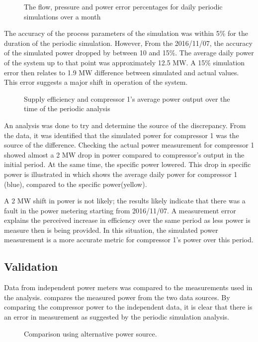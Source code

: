 	\begin{figure}[h!]
		\centering
		
		\caption{The flow, pressure and power error percentages for daily periodic simulations over a month}
		\label{fig: Periodic simulation}
	\end{figure} 
The accuracy of the process parameters of the simulation was within 5\% for the duration of the periodic simulation. However, From the 2016/11/07, the accuracy of the simulated power dropped by between 10 and 15\%. The average daily power of the system up to that point was approximately 12.5 MW. A 15\% simulation error then relates to 1.9 MW difference between simulated and actual values. This error suggests a major shift in operation of the system.
\par 
\begin{figure}[h!]
	\centering
	
	\caption{Supply efficiency and compressor 1's average power output over the time of the periodic analysis}
	\label{fig: MeasurementAccuracy.}
\end{figure} 

An analysis was done to try and determine the source of the discrepancy. From the data, it was identified that the simulated power for compressor 1 was the source of the difference. Checking the actual power measurement for compressor 1 showed almost a 2 MW drop in power compared to compressor's output in the initial period. At the same time, the specific power lowered. This drop in specific power is illustrated in  which shows the average daily power for compressor 1 (blue), compared to the specific power(yellow). 
\par
	
A 2 MW shift in power is not likely; the results likely indicate that there was a fault in the power metering starting from 2016/11/07. A measurement error explains the perceived increase in efficiency over the same period as less power is measure then is being provided.  In this situation, the simulated power measurement is a more accurate metric for compressor 1’s power over this period.

 \subsection{Validation}
Data from independent power meters was compared to the measurements used in the analysis.   compares the measured power from the two data sources. By comparing the compressor power to the independent data, it is clear that there is an error in measurement as suggested by the periodic simulation analysis.
	\begin{figure}[h!]
		\centering
		
		\caption{Comparison using alternative power source.}
		\label{fig: Corrected Periodic simulation}
	\end{figure} 
	
